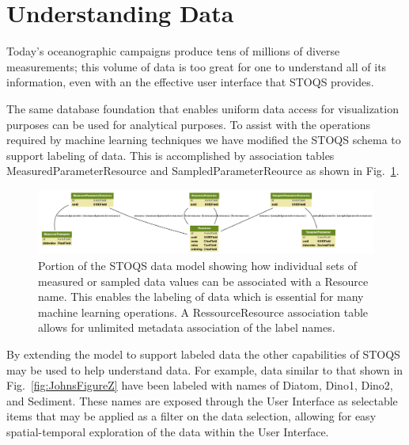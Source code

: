 \section{Understanding Data}

Today's oceanographic campaigns produce tens of millions of diverse measurements; this volume of data is too great for one to understand all of its information, even with an the effective user interface that STOQS provides.

The same database foundation that enables uniform data access for visualization purposes can be used for analytical purposes. To assist with the operations required by machine learning techniques we have modified the STOQS schema to support labeling of data. This is accomplished by association tables MeasuredParameterResource and SampledParameterReource as shown in Fig.~\ref{fig:stoqs_simple_model_labels}.

\begin{figure}[htbp]
\centering
\includegraphics[width=6.6in]{stoqs_simple_model_labels.png}
\caption{Portion of the STOQS data model showing how individual sets of measured or sampled data values can be associated with a Resource name. This enables the labeling of data which is essential for many machine learning operations. A RessourceResource association table allows for unlimited metadata association of the label names.}
\label{fig:stoqs_simple_model_labels}
\end{figure}

By extending the model to support labeled data the other capabilities of STOQS may be used to help understand data. For example, data similar to that shown in Fig.~\ref{fig:JohnsFigureZ} have been labeled with names of Diatom, Dino1, Dino2, and Sediment. These names are exposed through the User Interface as selectable items that may be applied as a filter on the data selection, allowing for easy spatial-temporal exploration of the data within the User Interface.

